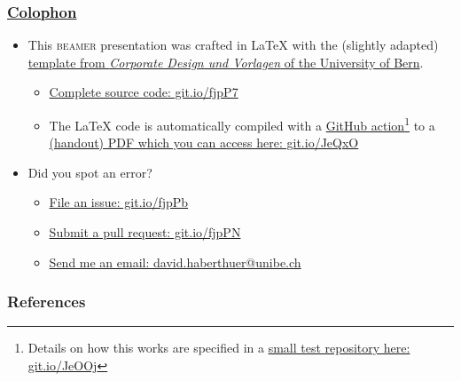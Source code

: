 \begin{frame}
	\frametitle{\href{https://en.wikipedia.org/wiki/Colophon_(publishing)}{Colophon}}
	\begin{itemize}
		\item This \textsc{beamer} presentation was crafted in \LaTeX\xspace with the (slightly adapted) \href{http://intern.unibe.ch/dienstleistungen/corporate_design_und_vorlagen/praesentationen/index_ger.html}{template from \emph{Corporate Design und Vorlagen} of the University of Bern}.
		\begin{itemize}
			\item \href{https://github.com/habi/lecture.microtomography/}{Complete source code: git.io/fjpP7}
			\item The \LaTeX\xspace code is automatically compiled with a \href{https://github.com/actions}{GitHub action}\footnote{Details on how this works are specified in a \href{https://github.com/habi/latex-test/}{small test repository here: git.io/JeOOj}} to a \href{https://habi.github.io/Lecture.Microtomography/XRayMicroTomography.Handout.pdf}{(handout) PDF which you can access here: git.io/JeQxO}
		\end{itemize}
		\item Did you spot an error?
		\begin{itemize}
			\item \href{https://github.com/habi/lecture.microtomography/issues}{File an issue: git.io/fjpPb}
			\item \href{https://github.com/habi/lecture.microtomography/pulls}{Submit a pull request: git.io/fjpPN}
			\item \href{mailto:david.haberthuer@unibe.ch?subject=Error\%20in\%20the\%20(micro)-tomography\%20lecture\&body=https://xkcd.com/386/}{Send me an email: david.haberthuer@unibe.ch}
		\end{itemize}
	\end{itemize}
\end{frame}

\begin{frame}[allowframebreaks]
	\frametitle{References}
	\renewcommand*{\bibfont}{\scriptsize}
	\printbibliography{}
\end{frame}


